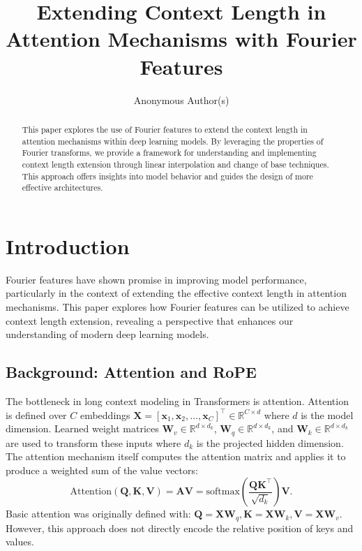 \documentclass{article}
\title{Extending Context Length in Attention Mechanisms with Fourier Features}
\author{Anonymous Author(s)}
\begin{document}
\maketitle

\begin{abstract}
This paper explores the use of Fourier features to extend the context length in attention mechanisms within deep learning models. By leveraging the properties of Fourier transforms, we provide a framework for understanding and implementing context length extension through linear interpolation and change of base techniques. This approach offers insights into model behavior and guides the design of more effective architectures.
\end{abstract}

\section{Introduction}

Fourier features have shown promise in improving model performance, particularly in the context of extending the effective context length in attention mechanisms. This paper explores how Fourier features can be utilized to achieve context length extension, revealing a perspective that enhances our understanding of modern deep learning models.



\subsection{Background: Attention and RoPE}

The bottleneck in long context modeling in Transformers is attention. Attention is defined over 
$C$ embeddings $\mathbf{X} = [\mathbf{x}_1, \mathbf{x}_2, \ldots, \mathbf{x}_C]^\top \in \mathbb{R}^{C \times d}$ where $d$ is the model dimension. Learned weight matrices $\mathbf{W}_v \in \mathbb{R}^{d \times d_k}$, $\mathbf{W}_q \in \mathbb{R}^{d \times d_k}$, and $\mathbf{W}_k \in \mathbb{R}^{d \times d_k}$ are used to transform these inputs where $d_k$ is the projected hidden dimension.  The attention mechanism itself computes the attention matrix and applies it to produce a weighted sum of the value vectors:
\begin{equation}
\text{Attention}(\mathbf{Q}, \mathbf{K}, \mathbf{V}) = \mathbf{A} \mathbf{V} = \text{softmax}\left(\frac{\mathbf{Q} \mathbf{K}^\top}{\sqrt{d_k}}\right)\mathbf{V}.
\end{equation}
Basic attention was originally defined with: $\mathbf{Q} = \mathbf{X} \mathbf{W}_q, \mathbf{K} = \mathbf{X} \mathbf{W}_k, \mathbf{V} = \mathbf{X} \mathbf{W}_v
$. However, this approach does not directly encode the relative position of keys and values. 
\end{document}
